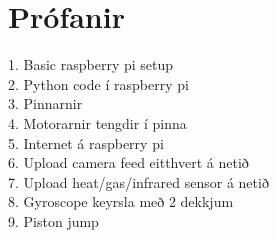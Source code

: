 \section{Prófanir}
\LARGE{
1. Basic raspberry pi setup\\
2. Python code í raspberry pi\\
3. Pinnarnir\\
4. Motorarnir tengdir í pinna\\
5. Internet á raspberry pi\\
6. Upload camera feed eitthvert á netið\\
7. Upload heat/gas/infrared sensor á netið\\
8. Gyroscope keyrsla með 2 dekkjum\\
9. Piston jump\\
}
